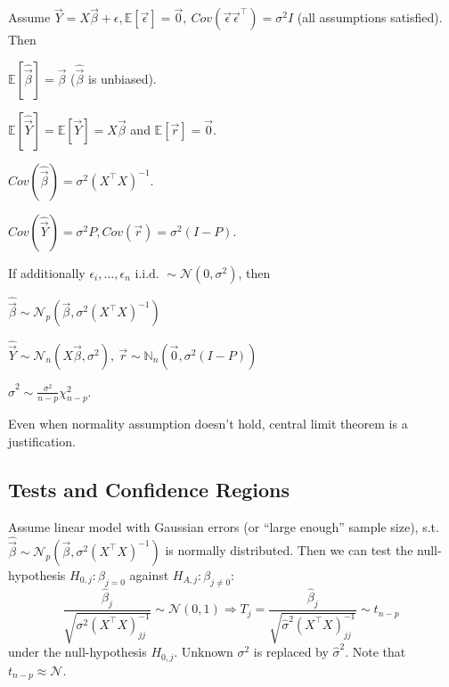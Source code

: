 \begin{notebox}\nospacing{}
  Assume $\vec{Y}=X\vec{\beta} + \epsilon, \mathbb{E}[\vec{\epsilon}]=\vec{0},\ Cov(\vec{\epsilon} \vec{\epsilon}^{\top}) = \sigma^{2}I$ (all assumptions satisfied). Then
  \begin{enumeratenosep}[label=\roman*]
    \item $\mathbb{E}[\hat{\vec{\beta}}] = \vec{\beta}$ ($\hat{\vec{\beta}}$ is unbiased).
    \item $\mathbb{E}[\hat{\vec{Y}}] = \mathbb{E}[\vec{Y}] = X\vec{\beta}$ and $\mathbb{E}[\vec{r}] = \vec{0}$.
    \item $Cov(\hat{\vec{\beta}}) = \sigma^{2}{(X^{\top}X)^{-1}}$.
    \item $Cov(\hat{\vec{Y}}) = \sigma^{2} P, Cov(\vec{r}) = \sigma^{2}(I-P)$.
  \end{enumeratenosep}
  If additionally $\epsilon_{i}, \dots, \epsilon_{n} \text{ i.i.d. } \sim \mathcal{N}(0, \sigma^{2})$, then
  \begin{enumeratenosep}[label=\roman*]
    \item $\hat{\vec{\beta}} \sim \mathcal{N}_{p}{(\vec{\beta}, \sigma^{2}(X^{\top}X)^{-1})}$
    \item $\hat{\vec{Y}} \sim \mathcal{N}_{n}(X\vec{\beta}, \sigma^{2}),\ \vec{r} \sim \mathbb{N}_{n}(\vec{0}, \sigma^{2}(I-P))$
    \item $\hat \sigma^{2} \sim \frac{\sigma^{2}}{n-p}\chi^{2}_{n-p}$.
  \end{enumeratenosep}
  Even when normality assumption doesn't hold, central limit theorem is a justification.
\end{notebox}
\subsection{Tests and Confidence Regions}\label{subsec:tests_and_confidence_regions}
\begin{sectionbox}[T-test]\nospacing{}
  Assume linear model with Gaussian errors (or ``large enough'' sample size), s.t. $\hat{\vec{\beta}} \sim \mathcal{N}_{p}\left(\vec{\beta}, \sigma^{2}{(X^{\top}X)}^{-1}\right)$ is normally distributed.
  Then we can test the null-hypothesis $H_{0,j}: \beta_{j = 0}$ against $H_{A,j}: \beta_{j \neq 0}$:
  \[\frac{\hat \beta_{j}}{\sqrt{\sigma^{2}{{(X^{\top}X)}^{-1}_{jj}}}} \sim \mathcal{N}(0,1) \Rightarrow  T_{j} = \frac{\hat \beta_{j}}{\sqrt{\hat \sigma^{2}{{(X^{\top}X)}^{-1}_{jj}}}} \sim t_{n-p}\ \] under the null-hypothesis $H_{0,j}$. Unknown $\sigma^{2}$ is replaced by $\hat \sigma^{2}$. Note that $t_{n-p} \approx \mathcal{N}$.
\end{sectionbox}

